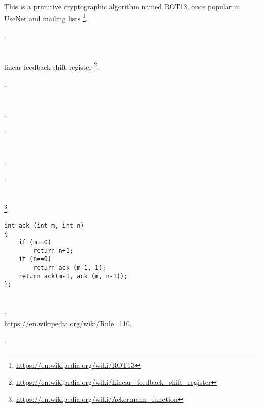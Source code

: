 {This is a primitive cryptographic algorithm named ROT13, once popular in UseNet and mailing lists}
\footnote{\url{https://en.wikipedia.org/wiki/ROT13}}.

\href{http://yurichev.com/RE-exercise-solutions/2/12/ROT13.c}{}.

\section{}

linear feedback shift register
\footnote{\url{https://en.wikipedia.org/wiki/Linear_feedback_shift_register}}.

\href{http://yurichev.com/RE-exercise-solutions/2/13/LFSR.c}{}.

\section{}

.

\href{http://yurichev.com/RE-exercise-solutions/2/14/GCD.c}{}.

\section{}

.

\href{http://yurichev.com/RE-exercise-solutions/2/15/monte.c}{}.

\section{}

\footnote{\url{https://en.wikipedia.org/wiki/Ackermann_function}}.

\begin{lstlisting}
int ack (int m, int n)
{
	if (m==0)
		return n+1;
	if (n==0)
		return ack (m-1, 1);
	return ack(m-1, ack (m, n-1));
};
\end{lstlisting}

\section{}

:\\
\url{https://en.wikipedia.org/wiki/Rule_110}.

\href{http://yurichev.com/RE-exercise-solutions/2/17/CA.c}{}.

